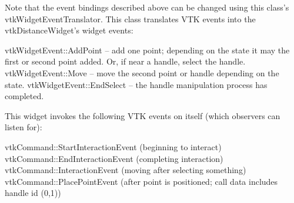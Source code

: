 Note that the event bindings described above can be changed using this class's vtk\-Widget\-Event\-Translator. This class translates V\-T\-K events into the vtk\-Distance\-Widget's widget events\-: 
\begin{DoxyPre}
   vtkWidgetEvent::AddPoint -- add one point; depending on the state
                               it may the first or second point added. Or,
                               if near a handle, select the handle.
   vtkWidgetEvent::Move -- move the second point or handle depending on the state.
   vtkWidgetEvent::EndSelect -- the handle manipulation process has completed.
 \end{DoxyPre}


This widget invokes the following V\-T\-K events on itself (which observers can listen for)\-: 
\begin{DoxyPre}
   vtkCommand::StartInteractionEvent (beginning to interact)
   vtkCommand::EndInteractionEvent (completing interaction)
   vtkCommand::InteractionEvent (moving after selecting something)
   vtkCommand::PlacePointEvent (after point is positioned;
                                call data includes handle id (0,1))
 \end{DoxyPre}


